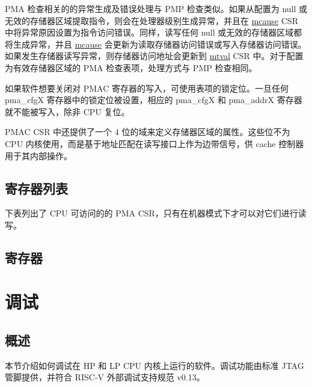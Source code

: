 \documentclass[main\_\_CN.tex]{subfiles}
\begin{document}
PMA 检查相关的的异常生成及错误处理与 PMP 检查类似。如果从配置为 null 或无效的存储器区域提取指令，则会在处理器级别生成异常，并且在 \hyperref[regdesc:MCAUSE]{mcause} CSR 中将异常原因设置为指令访问错误。同样，读写任何 null 或无效的存储器区域都将生成异常，并且 \hyperref[regdesc:MCAUSE]{mcause} 会更新为读取存储器访问错误或写入存储器访问错误。如果发生存储器读写异常，则存储器访问地址会更新到 \hyperref[regdesc:MTVAL]{mtval} CSR 中。对于配置为有效存储器区域的 PMA 检查表项，处理方式与 PMP 检查相同。

如果软件想要关闭对 PMAC 寄存器的写入，可使用表项的锁定位。一旦任何 pma\_cfgX 寄存器中的锁定位被设置，相应的 pma\_cfgX 和 pma\_addrX 寄存器就不能被写入，除非 CPU 复位。

PMAC CSR 中还提供了一个 4 位的域来定义存储器区域的属性。这些位不为 CPU 内核使用，而是基于地址匹配在读写接口上作为边带信号，供 cache 控制器用于其内部操作。


\clearpage
\hypertarget{riscvcpu-pma-reg-summ}{}
\subsection{寄存器列表}
\label{sec:riscvcpu-pma-reg-summ}

下表列出了 CPU 可访问的的 PMA CSR，只有在机器模式下才可以对它们进行读写。




\subsection{寄存器}
\label{sec:riscvcpu-pma-reg-desc}




\clearpage
\section{调试}
\label{sec:riscvcpu-dbg}


\subsection{概述}
\label{sec:riscvcpu-dbg-overview}
本节介绍如何调试在 HP 和 LP CPU 内核上运行的软件。调试功能由标准 JTAG 管脚提供，并符合 RISC-V 外部调试支持规范 v0.13。
\end{document}

